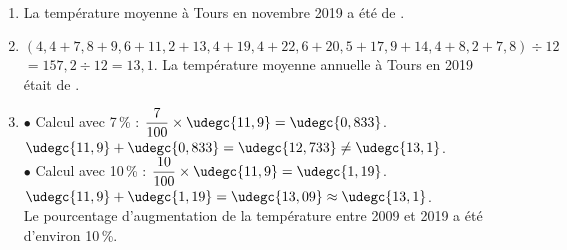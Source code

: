 \begin{corrige}
   \ \\ [-5mm]
      \begin{enumerate}
      \item La température moyenne à Tours en novembre 2019 a été de {\blue {}}.
      \item $(4,4+7,8+9,6+11,2+13,4+19,4+22,6+20,5+17,9+ 14,4+8,2+7,8)\div12$ \\
         $=157,2\div12 =13,1$. {\blue La température moyenne annuelle à Tours en 2019 était de }. \smallskip
         \item \textcolor{G1}{$\bullet$} Calcul avec 7\,\% : $\dfrac{7}{100}\times\udegc{11,9} =\udegc{0,833}$. \\ [1mm]
            $\udegc{11,9}+\udegc{0,833} =\udegc{12,733} \neq\udegc{13,1}$. \\ [1mm]
            \textcolor{G1}{$\bullet$} Calcul avec  10\,\% : $\dfrac{10}{100}\times\udegc{11,9} =\udegc{1,19}$. \\ [1mm]
            $\udegc{11,9}+\udegc{1,19} =\udegc{13,09} \approx\udegc{13,1}$. \\
           {\blue Le pourcentage d'augmentation de la température entre 2009 et 2019 a été d'environ 10\,\%}.
   \end{enumerate}
\end{corrige}


\Recreation

